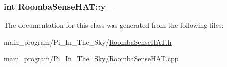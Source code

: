 \subsubsection[{\texorpdfstring{y\+\_\+}{y_}}]{\setlength{\rightskip}{0pt plus 5cm}int Roomba\+Sense\+H\+A\+T\+::y\+\_\+\hspace{0.3cm}{\ttfamily [protected]}}\hypertarget{class_roomba_sense_h_a_t_a3732a5d17f708fd18959beb0a4123d25}{}\label{class_roomba_sense_h_a_t_a3732a5d17f708fd18959beb0a4123d25}


The documentation for this class was generated from the following files\+:\begin{DoxyCompactItemize}
\item 
main\+\_\+program/\+Pi\+\_\+\+In\+\_\+\+The\+\_\+\+Sky/\hyperlink{_roomba_sense_h_a_t_8h}{Roomba\+Sense\+H\+A\+T.\+h}\item 
main\+\_\+program/\+Pi\+\_\+\+In\+\_\+\+The\+\_\+\+Sky/\hyperlink{_roomba_sense_h_a_t_8cpp}{Roomba\+Sense\+H\+A\+T.\+cpp}\end{DoxyCompactItemize}
